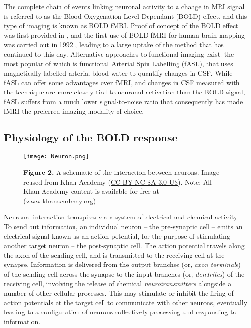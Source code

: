 The complete chain of events linking neuronal activity to a change in MRI signal is referred to as the Blood Oxygenation Level Dependant (BOLD) effect, and this type of imaging is known as BOLD fMRI.  Proof of concept of the BOLD effect was first provided in \citet*{Ogawa1990-it}, and the first use of BOLD fMRI for human brain mapping was carried out in 1992 \citep{Bandettini1992-jt, Kwong1992-uq, Ogawa1992-af}, leading to a large uptake of the method that has continued to this day. Alternative approaches to functional imaging exist, the most popular of which is functional Arterial Spin Labelling (fASL), that uses magnetically labelled arterial blood water to quantify changes in CSF. While fASL can offer some advantages over fMRI, and changes in CSF measured with the technique are more closely tied to neuronal activation than the BOLD signal, fASL suffers from a much lower signal-to-noise ratio that consequently has made fMRI the preferred imaging modality of choice. 

\subsection{Physiology of the BOLD response}

\begin{figure}[htbp]
\centering
	\texttt{[image: Neuron.png]}	
\caption*{\textbf{Figure 2:} A schematic of the interaction between neurons. Image reused from Khan Academy (\href{https://creativecommons.org/licenses/by-nc-sa/3.0/us/}{CC BY-NC-SA 3.0 US}). Note: All Khan Academy content is available for free at (\href{https://www.khanacademy.org/}{www.khanacademy.org}).}
\end{figure}

Neuronal interaction transpires via a system of electrical and chemical activity. To send out information, an individual neuron -- the pre-synaptic cell -- emits an electrical signal known as an action potential, for the purpose of stimulating another target neuron -- the post-synaptic cell. The action potential travels along the axon of the sending cell, and is transmitted to the receiving cell at the synapse. Information is delivered from the output branches (or, \textit{axon terminals}) of the sending cell across the synapse to the input branches (or, \textit{dendrites}) of the receiving cell, involving the release of chemical \textit{neurotransmitters} alongside a number of other cellular processes. This may stimulate or inhibit the firing of action potentials at the target cell to communicate with other neurons, eventually leading to a configuration of neurons collectively processing and responding to information. 

